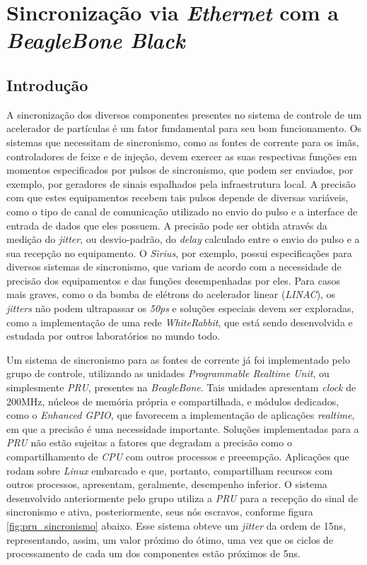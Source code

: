 \section {Sincronização via \textit{Ethernet} com a \textit{BeagleBone Black}}

\subsection {Introdução}

A sincronização dos diversos componentes presentes no sistema de controle de um
acelerador de partículas é um fator fundamental para seu bom funcionamento. Os
sistemas que necessitam de sincronismo, como as fontes de corrente para os imãs,
controladores de feixe e de injeção, devem exercer as suas
respectivas funções em momentos especificados por pulsos de sincronismo, que
podem ser enviados, por exemplo, por geradores de sinais espalhados pela
infraestrutura local. A precisão com que estes equipamentos recebem tais pulsos
depende de diversas variáveis, como o tipo de canal de comunicação
utilizado no envio do pulso e a interface de entrada de dados que eles possuem.
A precisão pode ser obtida através da medição do \textit{jitter}, ou
desvio-padrão, do \textit{delay} calculado entre o envio do pulso e a sua
recepção no equipamento.
O \textit{Sirius}, por exemplo, possui especificações para diversos sistemas de
sincronismo, que variam de acordo com a necessidade de precisão dos equipamentos
e das funções desempenhadas por eles. Para casos mais graves, como o da bomba de
elétrons do acelerador linear (\textit{LINAC}), os \textit{jitters} não podem
ultrapassar os \textit{50ps} e soluções especiais devem ser exploradas, como a
implementação de uma rede \textit{WhiteRabbit}, que está sendo
desenvolvida e estudada por outros laboratórios no mundo todo.

\vspace{12pt}

Um sistema de sincronismo para as fontes de corrente já
foi implementado pelo grupo de controle, utilizando as unidades
\textit{Programmable Realtime Unit}, ou simplesmente \textit{PRU}, presentes na
\textit{BeagleBone}. Tais unidades apresentam \textit{clock} de 200MHz,
núcleos de memória própria e compartilhada, e módulos dedicados, como o
\textit{Enhanced GPIO}, que favorecem a implementação de aplicações
\textit{realtime}, em que a precisão é uma necessidade importante. Soluções
implementadas para a \textit{PRU} não estão sujeitas a fatores que degradam a
precisão como o compartilhamento de \textit{CPU} com outros
processos e preeempção. Aplicações que rodam sobre \textit{Linux} embarcado e
que, portanto, compartilham recursos com outros processos, apresentam,
geralmente, desempenho inferior. O sistema desenvolvido anteriormente pelo grupo
utiliza a \textit{PRU} para a recepção do sinal de sincronismo e ativa, posteriormente, seus nós
escravos, conforme figura \ref{fig:pru_sincronismo} abaixo. Esse sistema obteve
um \textit{jitter} da ordem de 15ns, representando, assim, um valor próximo do
ótimo, uma vez que os ciclos de processamento de cada um dos componentes estão
próximos de 5ns.


